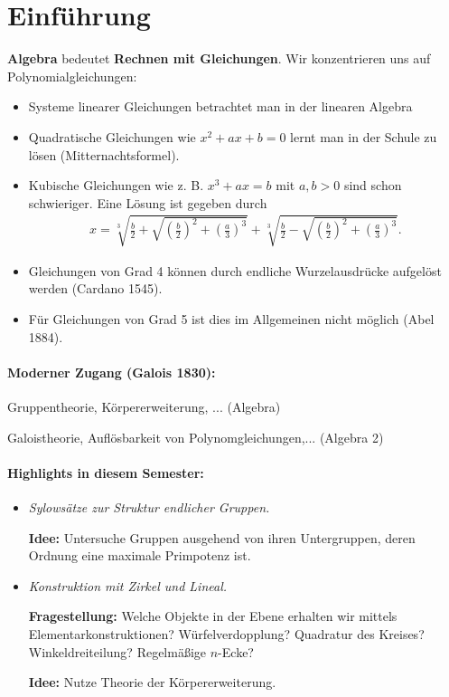 
\section{Einführung}
\textbf{Algebra} bedeutet \textbf{Rechnen mit Gleichungen}. Wir konzentrieren uns auf Polynomialgleichungen:
\begin{itemize}
	\item Systeme linearer Gleichungen betrachtet man in der linearen Algebra
	\item Quadratische Gleichungen wie $x^2 + ax + b  = 0$ lernt man in der Schule zu lösen (Mitternachtsformel).
	\item Kubische Gleichungen wie z. B. $x^3 + ax = b$ mit $a,b > 0$ sind schon schwieriger. Eine Lösung ist gegeben durch
	\begin{align*}
		x = \sqrt[3]{\frac{b}{2} + \sqrt{\left(\frac{b}{2}\right)^2 + \left(\frac{a}{3}\right)^3}} + \sqrt[3]{\frac{b}{2} - \sqrt{\left(\frac{b}{2}\right)^2 + \left(\frac{a}{3}\right)^3}}.
	\end{align*}
	\item Gleichungen von Grad 4 können durch endliche Wurzelausdrücke aufgelöst werden (Cardano 1545).
	\item Für Gleichungen von Grad 5 ist dies im Allgemeinen nicht möglich (Abel 1884).
\end{itemize}

\paragraph{Moderner Zugang (Galois 1830): }
Gruppentheorie, Körpererweiterung, ... (Algebra)

Galoistheorie, Auflösbarkeit von Polynomgleichungen,... (Algebra 2)

\paragraph{Highlights in diesem Semester: } 
\begin{itemize}
	\item \textit{Sylowsätze zur Struktur endlicher Gruppen.}
	
	\textbf{Idee: } Untersuche Gruppen ausgehend von ihren Untergruppen, deren Ordnung eine maximale Primpotenz ist.
	\item \textit{Konstruktion mit Zirkel und Lineal.}
	
	\textbf{Fragestellung: } Welche Objekte in der Ebene erhalten wir mittels Elementarkonstruktionen? Würfelverdopplung? Quadratur des Kreises? Winkeldreiteilung? Regelmäßige $n$-Ecke?
	
	\textbf{Idee: } Nutze Theorie der Körpererweiterung.
\end{itemize}